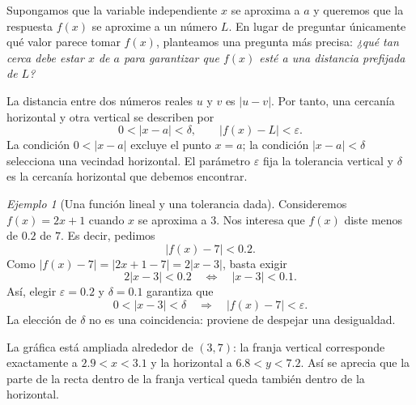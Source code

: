 \documentclass[12pt]{article}
\theoremstyle{remark}
\newtheorem{ejemplo}{Ejemplo}
\begin{document}
Supongamos que la variable independiente $x$ se aproxima a $a$ y queremos que la respuesta $f(x)$ se aproxime a un número $L$. En lugar de preguntar únicamente qué valor parece tomar $f(x)$, planteamos una pregunta más precisa: \emph{¿qué tan cerca debe estar $x$ de $a$ para garantizar que $f(x)$ esté a una distancia prefijada de $L$?}

La distancia entre dos números reales $u$ y $v$ es $|u-v|$. Por tanto, una cercanía horizontal y otra vertical se describen por
\[
 0<|x-a|<\delta,\qquad |f(x)-L|<\varepsilon.
\]
La condición $0<|x-a|$ excluye el punto $x=a$; la condición $|x-a|<\delta$ selecciona una vecindad horizontal. El parámetro $\varepsilon$ fija la tolerancia vertical y $\delta$ es la cercanía horizontal que debemos encontrar.

\begin{ejemplo}[Una función lineal y una tolerancia dada]
Consideremos $f(x)=2x+1$ cuando $x$ se aproxima a $3$. Nos interesa que $f(x)$ diste menos de $0.2$ de $7$. Es decir, pedimos
\[
 |f(x)-7|<0.2.
\]
Como $|f(x)-7|=|2x+1-7|=2|x-3|$, basta exigir
\[
 2|x-3|<0.2\quad\Longleftrightarrow\quad |x-3|<0.1.
\]
Así, elegir $\varepsilon=0.2$ y $\delta=0.1$ garantiza que
\[
 0<|x-3|<\delta\quad\Longrightarrow\quad |f(x)-7|<\varepsilon.
\]
La elección de $\delta$ no es una coincidencia: proviene de despejar una desigualdad.
\end{ejemplo}

\begin{center}
\end{center}
La gráfica está ampliada alrededor de $(3,7)$: la franja vertical corresponde exactamente a $2.9<x<3.1$ y la horizontal a $6.8<y<7.2$. Así se aprecia que la parte de la recta dentro de la franja vertical queda también dentro de la horizontal.
\end{document}
